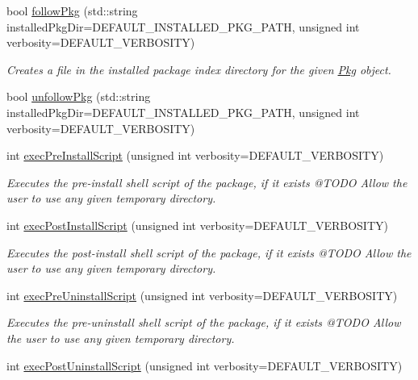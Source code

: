 \begin{DoxyCompactItemize}
bool \mbox{\hyperlink{classPkg_a533874d8ffcc6ebb0460f5fa2e823d1f}{follow\+Pkg}} (std\+::string installed\+Pkg\+Dir=D\+E\+F\+A\+U\+L\+T\+\_\+\+I\+N\+S\+T\+A\+L\+L\+E\+D\+\_\+\+P\+K\+G\+\_\+\+P\+A\+TH, unsigned int verbosity=D\+E\+F\+A\+U\+L\+T\+\_\+\+V\+E\+R\+B\+O\+S\+I\+TY)
\begin{DoxyCompactList}\small\item\em Creates a file in the installed package index directory for the given \mbox{\hyperlink{classPkg}{Pkg}} object. \end{DoxyCompactList}\item 
bool \mbox{\hyperlink{classPkg_a5908bf9ce7885d01dee506eea147dbfb}{unfollow\+Pkg}} (std\+::string installed\+Pkg\+Dir=D\+E\+F\+A\+U\+L\+T\+\_\+\+I\+N\+S\+T\+A\+L\+L\+E\+D\+\_\+\+P\+K\+G\+\_\+\+P\+A\+TH, unsigned int verbosity=D\+E\+F\+A\+U\+L\+T\+\_\+\+V\+E\+R\+B\+O\+S\+I\+TY)
\item 
int \mbox{\hyperlink{classPkg_ab525ef2d1db4d21a2dac6bfebeaeb881}{exec\+Pre\+Install\+Script}} (unsigned int verbosity=D\+E\+F\+A\+U\+L\+T\+\_\+\+V\+E\+R\+B\+O\+S\+I\+TY)
\begin{DoxyCompactList}\small\item\em Executes the pre-\/install shell script of the package, if it exists @\+T\+O\+DO Allow the user to use any given temporary directory. \end{DoxyCompactList}\item 
int \mbox{\hyperlink{classPkg_a62fed0e8f8d13a30c7735e16aeebe046}{exec\+Post\+Install\+Script}} (unsigned int verbosity=D\+E\+F\+A\+U\+L\+T\+\_\+\+V\+E\+R\+B\+O\+S\+I\+TY)
\begin{DoxyCompactList}\small\item\em Executes the post-\/install shell script of the package, if it exists @\+T\+O\+DO Allow the user to use any given temporary directory. \end{DoxyCompactList}\item 
int \mbox{\hyperlink{classPkg_aaf0fa6056c0ae99a40aee7ac4990f613}{exec\+Pre\+Uninstall\+Script}} (unsigned int verbosity=D\+E\+F\+A\+U\+L\+T\+\_\+\+V\+E\+R\+B\+O\+S\+I\+TY)
\begin{DoxyCompactList}\small\item\em Executes the pre-\/uninstall shell script of the package, if it exists @\+T\+O\+DO Allow the user to use any given temporary directory. \end{DoxyCompactList}\item 
int \mbox{\hyperlink{classPkg_aba52920e6c2b65bb71b6904d74dd6754}{exec\+Post\+Uninstall\+Script}} (unsigned int verbosity=D\+E\+F\+A\+U\+L\+T\+\_\+\+V\+E\+R\+B\+O\+S\+I\+TY)

\end{DoxyCompactItemize}

